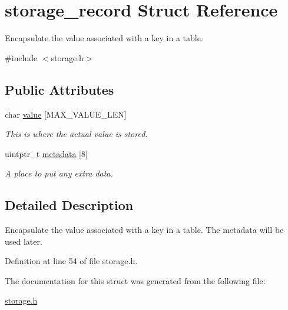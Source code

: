 \hypertarget{structstorage__record}{
\section{storage\_\-record Struct Reference}
\label{structstorage__record}
}


Encapsulate the value associated with a key in a table.  




{\ttfamily \#include $<$storage.h$>$}

\subsection*{Public Attributes}
\begin{DoxyCompactItemize}
\item 
\hypertarget{structstorage__record_a114ea83d63789debe24f3857f8222933}{
char \hyperlink{structstorage__record_a114ea83d63789debe24f3857f8222933}{value} \mbox{[}MAX\_\-VALUE\_\-LEN\mbox{]}}
\label{structstorage__record_a114ea83d63789debe24f3857f8222933}

\begin{DoxyCompactList}\small\item\em This is where the actual value is stored. \item\end{DoxyCompactList}\item 
\hypertarget{structstorage__record_ab9bb60cfd2dc26f6a49218d6b8612dca}{
uintptr\_\-t \hyperlink{structstorage__record_ab9bb60cfd2dc26f6a49218d6b8612dca}{metadata} \mbox{[}8\mbox{]}}
\label{structstorage__record_ab9bb60cfd2dc26f6a49218d6b8612dca}

\begin{DoxyCompactList}\small\item\em A place to put any extra data. \item\end{DoxyCompactList}\end{DoxyCompactItemize}


\subsection{Detailed Description}
Encapsulate the value associated with a key in a table. The metadata will be used later. 

Definition at line 54 of file storage.h.



The documentation for this struct was generated from the following file:\begin{DoxyCompactItemize}
\item 
\hyperlink{storage_8h}{storage.h}\end{DoxyCompactItemize}
